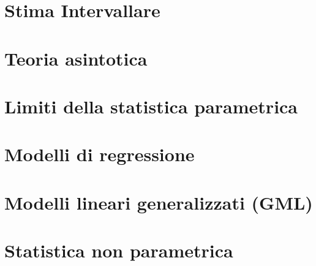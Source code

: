 \documentclass{article}
\begin{document}


\newpage

\section{Stima Intervallare}



\newpage

\section{Teoria asintotica}



\newpage

\section{Limiti della statistica parametrica}



\newpage

\section{Modelli di regressione}



\newpage

\section{Modelli lineari generalizzati (GML)}



\newpage

\section{Statistica non parametrica}


\end{document}
